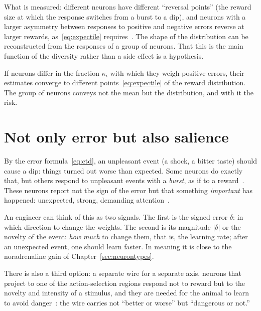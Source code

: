 What is measured: different  neurons have different ``reversal points'' (the reward size at which the response switches from a burst to a dip), and neurons with a larger asymmetry between responses to positive and negative errors reverse at larger rewards, as~\eqref{eq:expectile} requires~\cite{Dabney2020}. The shape of the distribution can be reconstructed from the responses of a group of neurons. That this is the main function of the diversity rather than a side effect is a hypothesis.

\begin{keyblock}
\begin{proposition}
\label{prop:expectile}
If  neurons differ in the fraction $\kappa_i$ with which they weigh positive errors, their estimates converge to different points~\eqref{eq:expectile} of the reward distribution. The group of neurons conveys not the mean but the distribution, and with it the risk.
\end{proposition}
\end{keyblock}

\section{Not only error but also salience}

By the error formula~\eqref{eq:ctd}, an unpleasant event (a shock, a bitter taste) should cause a dip: things turned out worse than expected. Some  neurons do exactly that, but others respond to unpleasant events with a \emph{burst}, as if to a reward~\cite{Matsumoto2009}. These neurons report not the sign of the error but that something \emph{important} has happened: unexpected, strong, demanding attention~\cite{BrombergMartin2010}.

An engineer can think of this as two signals. The first is the signed error $\delta$: in which direction to change the weights. The second is its magnitude $|\delta|$ or the novelty of the event: \emph{how much} to change them, that is, the learning rate; after an unexpected event, one should learn faster. In meaning it is close to the noradrenaline gain of Chapter~\ref{sec:neurontypes}.

There is also a third option: a separate wire for a separate axis.  neurons that project to one of the action-selection regions respond not to reward but to the novelty and intensity of a stimulus, and they are needed for the animal to learn to avoid danger~\cite{Menegas2018}: the wire carries not ``better or worse'' but ``dangerous or not.''

